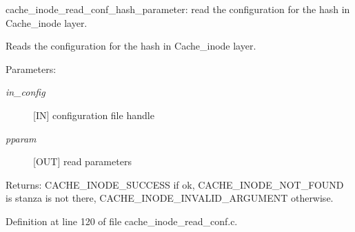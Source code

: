 cache\_\-inode\_\-read\_\-conf\_\-hash\_\-parameter: read the configuration for the hash in Cache\_\-inode layer.

Reads the configuration for the hash in Cache\_\-inode layer.

\begin{Desc}
\item[Parameters:]
\begin{description}
\item[{\em in\_\-config}][IN] configuration file handle \item[{\em pparam}][OUT] read parameters\end{description}
\end{Desc}
\begin{Desc}
\item[Returns:]CACHE\_\-INODE\_\-SUCCESS if ok, CACHE\_\-INODE\_\-NOT\_\-FOUND is stanza is not there, CACHE\_\-INODE\_\-INVALID\_\-ARGUMENT otherwise. \end{Desc}


Definition at line 120 of file cache\_\-inode\_\-read\_\-conf.c.